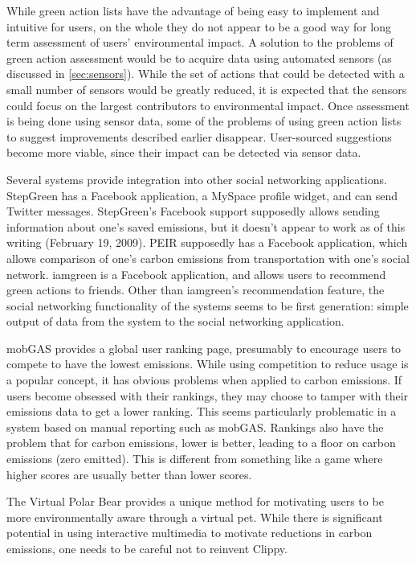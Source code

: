 While green action lists have the advantage of being easy to implement and intuitive for users, on the whole they do not appear to be a good way for long term assessment of users' environmental impact. A solution to the problems of green action assessment would be to acquire data using automated sensors (as discussed in \autoref{sec:sensors}). While the set of actions that could be detected with a small number of sensors would be greatly reduced, it is expected that the sensors could focus on the largest contributors to environmental impact. Once assessment is being done using sensor data, some of the problems of using green action lists to suggest improvements described earlier disappear. User-sourced suggestions become more viable, since their impact can be detected via sensor data.

Several systems provide integration into other social networking applications. StepGreen has a Facebook application, a MySpace profile widget, and can send Twitter messages. StepGreen's Facebook support supposedly allows sending information about one's saved emissions, but it doesn't appear to work as of this writing (February 19, 2009). PEIR supposedly has a Facebook application, which allows comparison of one's carbon emissions from transportation with one's social network. iamgreen is a Facebook application, and allows users to recommend green actions to friends. Other than iamgreen's recommendation feature, the social networking functionality of the systems seems to be first generation: simple output of data from the system to the social networking application.

mobGAS provides a global user ranking page, presumably to encourage users to compete to have the lowest emissions. While using competition to reduce usage is a popular concept, it has obvious problems when applied to carbon emissions. If users become obsessed with their rankings, they may choose to tamper with their emissions data to get a lower ranking. This seems particularly problematic in a system based on manual reporting such as mobGAS. Rankings also have the problem that for carbon emissions, lower is better, leading to a floor on carbon emissions (zero \COtwo emitted). This is different from something like a game where higher scores are usually better than lower scores.

The Virtual Polar Bear provides a unique method for motivating users to be more environmentally aware through a virtual pet. While there is significant potential in using interactive multimedia to motivate reductions in carbon emissions, one needs to be careful not to reinvent Clippy.

